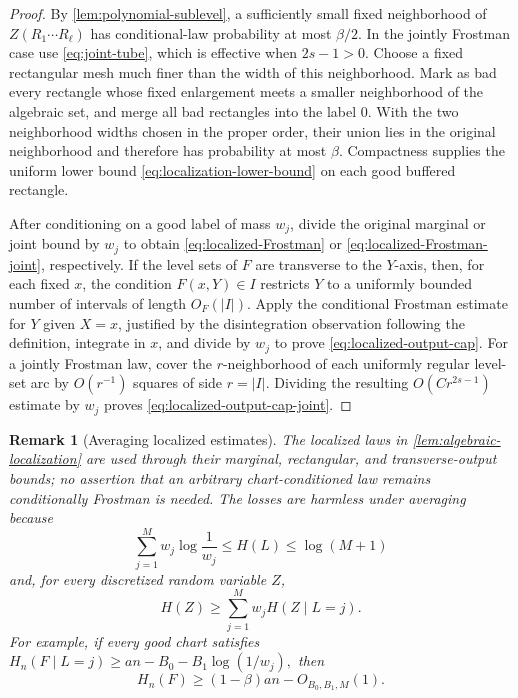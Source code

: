 \documentclass[11pt]{article}
\newtheorem{remark}[theorem]{Remark}
\begin{document}
\begin{proof}
By \cref{lem:polynomial-sublevel}, a sufficiently small fixed
neighborhood of
\(Z(R_1\cdots R_\ell)\) has conditional-law probability at most
\(\beta/2\).  In the jointly Frostman case use
\eqref{eq:joint-tube}, which is effective when \(2s-1>0\).
Choose a fixed rectangular mesh much finer than the width of this
neighborhood.  Mark as bad every rectangle whose fixed enlargement
meets a smaller neighborhood of the algebraic set, and merge all bad
rectangles into the label \(0\).  With the two neighborhood widths
chosen in the proper order, their union lies in the original
neighborhood and therefore has probability at most \(\beta\).
Compactness supplies the uniform lower bound
\eqref{eq:localization-lower-bound} on each good buffered rectangle.

After conditioning on a good label of mass \(w_j\), divide the
original marginal or joint bound by \(w_j\) to obtain
\eqref{eq:localized-Frostman} or
\eqref{eq:localized-Frostman-joint}, respectively.  If the level sets of \(F\) are
transverse to the \(Y\)-axis, then, for each fixed \(x\), the
condition \(F(x,Y)\in I\) restricts \(Y\) to a uniformly bounded
number of intervals of length \(O_F(|I|)\).  Apply the conditional
Frostman estimate for \(Y\) given \(X=x\), justified by the
disintegration observation following the definition, integrate in
\(x\), and
divide by \(w_j\) to prove
\eqref{eq:localized-output-cap}.
For a jointly Frostman law, cover the \(r\)-neighborhood of each
uniformly regular level-set arc by \(O(r^{-1})\) squares of side
\(r=|I|\).  Dividing the resulting \(O(Cr^{2s-1})\) estimate by
\(w_j\) proves \eqref{eq:localized-output-cap-joint}.
\end{proof}

\begin{remark}[Averaging localized estimates]
\label{rem:localized-averaging}
The localized laws in \cref{lem:algebraic-localization} are used
through their marginal, rectangular, and transverse-output bounds;
no assertion that an arbitrary chart-conditioned law remains
conditionally Frostman is needed.  The losses are harmless under
averaging because
\begin{equation}
 \sum_{j=1}^M w_j\log\frac{1}{w_j}\le H(L)\le\log(M+1)
 \label{eq:chart-log-loss}
\end{equation}
and, for every discretized random variable \(Z\),
\begin{equation}
 H(Z)\ge\sum_{j=1}^M w_jH(Z\mid L=j).
 \label{eq:chart-entropy-average}
\end{equation}
For example, if every good chart satisfies
\(
 H_n(F\mid L=j)\ge an-B_0-B_1\log(1/w_j),
\)
then
\begin{equation}
 H_n(F)\ge(1-\beta)an-O_{B_0,B_1,M}(1).
 \label{eq:localized-globalization}
\end{equation}
\end{remark}
\end{document}
